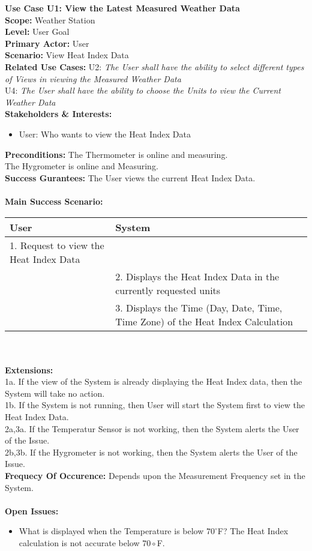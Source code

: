 \documentclass[letterpaper]{article}
\begin{document}
\noindent
\textbf{Use Case U1:  View the Latest Measured Weather Data}\\
\textbf{Scope:  }Weather Station\\
\textbf{Level:  }User Goal\\
\textbf{Primary Actor:  }User\\
\textbf{Scenario:  }View Heat Index Data\\
\textbf{Related Use Cases:  }U2: \textit{The User shall have the
ability to select different types of Views in viewing the Measured
Weather Data}\\ U4:  \textit{The User shall have the ability to
choose the Units to view the Current Weather Data}\\
\textbf{Stakeholders \& Interests:  }
\begin{itemize}
\item User:  Who wants to view the Heat Index Data
\end{itemize}
\textbf{Preconditions:  }The Thermometer is online and measuring.\\
The Hygrometer is online and Measuring.\\
\textbf{Success Gurantees:  }The User views the current Heat Index
Data.\\\\
\textbf{Main Success Scenario:  }\\
\begin{tabular}{|p{6cm}|p{6cm}|}\hline
\textbf{User} & \textbf{System}\\\hline
1.  Request to view the Heat Index Data & \\\hline
& 2.  Displays the Heat Index Data in the currently requested
units\\\hline
& 3.  Displays the Time (Day, Date, Time, Time Zone) of the
Heat Index Calculation\\\hline
\end{tabular}\\\\
\textbf{Extensions:  }\\
1a.  If the view of the System is already displaying the Heat Index
data, then the System will take no action.\\
1b.  If the System is not running, then User will start the System
first to view the Heat Index Data.\\
2a,3a.  If the Temperatur Sensor is not working, then the System
alerts the User of the Issue.\\
2b,3b.  If the Hygrometer is not working, then the System alerts the
User of the Issue.\\
\textbf{Frequecy Of Occurence: } Depends upon the Measurement
Frequency set in the System.\\\\
\textbf{Open Issues: }
\begin{itemize}
\item What is displayed when the Temperature is below $70^\circ$F?
The Heat Index calculation is not accurate below
$70\circ$F.
\end{itemize}
\end{document}
